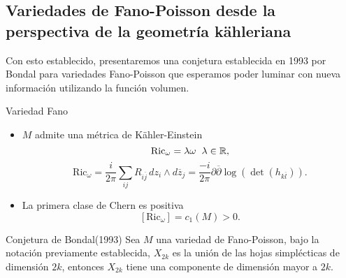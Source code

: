 \documentclass[letterpaper]{beamer}
\newcommand{\re}{\ensuremath{\mathbb R }}
\begin{document}
\subsection{Variedades de Fano-Poisson desde la perspectiva de la geometr\'ia k\"ahleriana}
\begin{frame} Con esto establecido, presentaremos una conjetura establecida en 1993 por Bondal para variedades Fano-Poisson que esperamos poder
luminar con nueva informaci\'on utilizando la funci\'on volumen.
\begin{block}{Variedad Fano}
\begin{itemize}
            \item $M$ admite una m\'etrica de K\"ahler-Einstein
                $$
                \textrm{Ric}_{\omega}=\lambda\omega\hspace{0.2cm}\lambda\in\re,
                $$
                $$
                    \textrm{Ric}_{\omega}=\frac{i}{2\pi}\sum_{ij}R_{i\overline{j}}\,dz_i\wedge
                    d\overline{z}_j=\frac{-i}{2\pi}\partial\overline{\partial}\log(\det(h_{k\overline{l}})).
                $$
            \item La primera clase de Chern es positiva
            $$
                    [\textrm{Ric}_{\omega}]=c_1(M)>0.
            $$
\end{itemize}
\end{block}
\end{frame}
\begin{frame}
    \begin{block}{Conjetura de Bondal(1993)}\label{Bondal}
            Sea $M$ una variedad de Fano-Poisson, bajo la notaci\'on previamente establecida, $X_{2k}$ es la uni\'on de las hojas
            simpl\'ecticas de dimensi\'on $2k$, entonces $X_{2k}$ tiene una componente de dimensi\'on mayor a $2k$.
    \end{block}
\end{frame}
\end{document}
